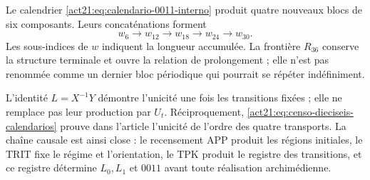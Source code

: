 Le calendrier \eqref{act21:eq:calendario-0011-interno} produit quatre nouveaux
blocs de six composants. Leurs concaténations forment
\[
 w_6\longrightarrow w_{12}\longrightarrow w_{18}
 \longrightarrow w_{24}\longrightarrow w_{30}.
\]
Les sous-indices de \(w\) indiquent la longueur accumulée. La frontière \(R_{36}\) conserve la structure terminale et ouvre la relation de prolongement ; elle n'est pas renommée comme un dernier bloc périodique qui pourrait se répéter indéfiniment.

L'identité \(L=X^{-1}Y\) démontre l'unicité une fois les
transitions fixées ; elle ne remplace pas leur production par \(U_t\). Réciproquement,
\eqref{act21:eq:censo-dieciseis-calendarios} prouve dans l'article l'unicité
de l'ordre des quatre transports. La chaîne causale est ainsi close :
le recensement APP produit les régions initiales, le TRIT fixe le régime et
l'orientation, le TPK produit le registre des transitions, et ce registre
détermine \(L_0,L_1\) et \(0011\) avant toute réalisation archimédienne.


\par\endgroup
